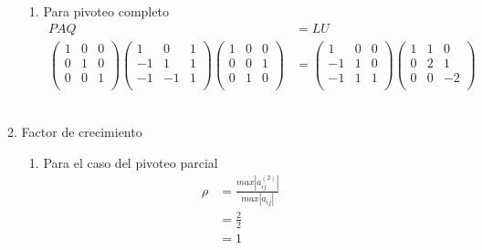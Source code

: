 \begin{enumerate}[]
\begin{enumerate}[]
\begin{enumerate}[]
            \item Para pivoteo completo
            \begin{align*}
                PAQ &= LU\\
                \begin{pmatrix}
                1 & 0 & 0 \\ 
                0 & 1 & 0 \\
                0 & 0 & 1 \\
                \end{pmatrix}
                \begin{pmatrix}
                1 & 0 & 1 \\ 
                -1 & 1 & 1 \\
                -1 & -1 & 1 \\
                \end{pmatrix}
                \begin{pmatrix}
                1 & 0 & 0 \\ 
                0 & 0 & 1 \\
                0 & 1 & 0 \\
                \end{pmatrix} &= 
                \begin{pmatrix}
                1 & 0 & 0 \\ 
                -1 & 1 & 0 \\
                -1 & 1 & 1 \\
                \end{pmatrix}
                \begin{pmatrix}
                1 & 1 & 0 \\ 
                0 & 2 & 1 \\
                0 & 0 & -2 \\
                \end{pmatrix}
            \end{align*}
            \\
        \end{enumerate}
        
        \item Factor de crecimiento
        \begin{enumerate}[]
            \item Para el caso del pivoteo parcial
            \begin{align*}
                \rho &=  \frac{max |a_{ij}^{(2)}|}{max |a_{ij}|}\\
                &=  \frac{2}{2}\\
                &=  1\\
            \end{align*}
            

\end{enumerate}
\end{enumerate}
\end{enumerate}
